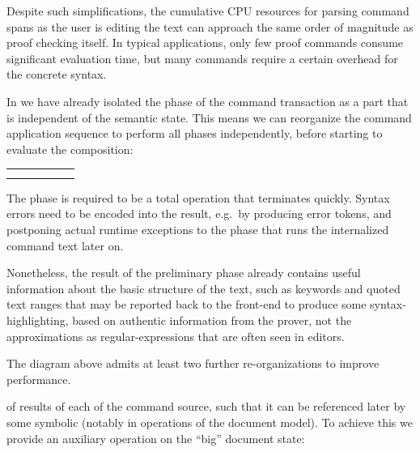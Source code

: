 \begin{isabellebody}
\begin{isamarkuptext}
  Despite such simplifications, the cumulative CPU resources for
  parsing command spans as the user is editing the text can approach
  the same order of magnitude as proof checking itself.  In typical
  applications, only few proof commands consume significant evaluation
  time, but many commands require a certain overhead for the concrete
  syntax.

  \medskip In  we have already isolated the
   phase of the command transaction as a part that is
  independent of the semantic state.  This means we can reorganize the
  command application sequence to perform all  phases
  independently, before starting to evaluate the composition:

  \medskip
  \begin{tabular}{llllll}
  \isa{{\isasymdown}\isactrlsup r\isactrlsup e\isactrlsup a\isactrlsup d}  &                  & \isa{{\isasymdown}\isactrlsup r\isactrlsup e\isactrlsup a\isactrlsup d}   & & \isa{{\isasymdots}} \\
  \isa{st}    & \isa{{\isasymlongrightarrow}\isactrlsup e\isactrlsup v\isactrlsup a\isactrlisup l} & \isa{st{\isacharprime}}    & \isa{{\isasymlongrightarrow}\isactrlsup e\isactrlsup v\isactrlsup a\isactrlsup l} & \isa{st{\isacharprime}{\isacharprime}} & \isa{{\isasymdots}} \\
  \end{tabular}
  \medskip

  \noindent The  phase is required to be a total operation
  that terminates quickly.  Syntax errors need to be encoded into the
  result, e.g.\ by producing error tokens, and postponing actual
  runtime exceptions to the  phase that runs the
  internalized command text later on.

  Nonetheless, the result of the preliminary  phase
  already contains useful information about the basic structure of the
  text, such as keywords and quoted text ranges that may be reported
  back to the front-end to produce some syntax-highlighting, based on
  authentic information from the prover, not the approximations as
  regular-expressions that are often seen in editors.

  \medskip The diagram above admits at least two further
  re-organizations to improve performance.

   of results of each  of the
  command source, such that it can be referenced later by some
  symbolic  (notably in operations of the document model).
  To achieve this we provide an auxiliary operation on the ``big''
  document state:


\end{isamarkuptext}
\end{isabellebody}

